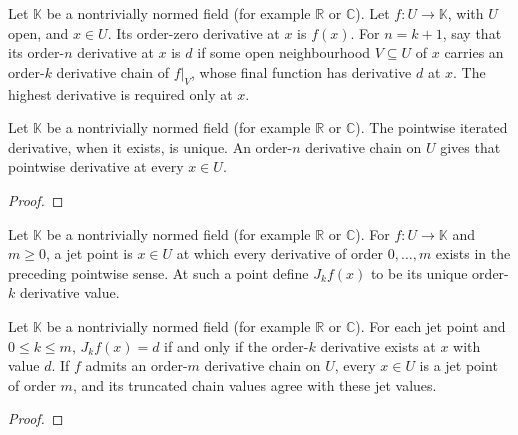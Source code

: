 \begin{supporting}
\begin{definition}
\label{def:open-domain-pointwise-derivative}
\leanok
Let $\mathbb K$ be a nontrivially normed field (for example $\mathbb R$ or $\mathbb C$).
Let $f:U\to\mathbb K$, with $U$ open, and $x\in U$. Its order-zero derivative
at $x$ is $f(x)$. For $n=k+1$, say that its order-$n$ derivative at $x$ is $d$
if some open neighbourhood $V\subseteq U$ of $x$ carries an order-$k$
derivative chain of $f|_V$, whose final function has derivative $d$ at $x$.
The highest derivative is required only at $x$.
\end{definition}

\begin{theorem}
\label{thm:open-domain-pointwise-derivative}
\leanok
Let $\mathbb K$ be a nontrivially normed field (for example $\mathbb R$ or $\mathbb C$).
The pointwise iterated derivative, when it exists, is unique. An order-$n$
derivative chain on $U$ gives that pointwise derivative at every $x\in U$.
\end{theorem}
\begin{proof}
\leanok
\end{proof}

\begin{definition}
\label{def:open-domain-derivative-jet}
\leanok
Let $\mathbb K$ be a nontrivially normed field (for example $\mathbb R$ or $\mathbb C$).
For $f:U\to\mathbb K$ and $m\ge0$, a jet point is $x\in U$ at which every
derivative of order $0,\ldots,m$ exists in the preceding pointwise sense.
At such a point define $J_kf(x)$ to be its unique order-$k$ derivative value.
\end{definition}

\begin{theorem}
\label{thm:open-domain-derivative-jet}
\leanok
Let $\mathbb K$ be a nontrivially normed field (for example $\mathbb R$ or $\mathbb C$).
For each jet point and $0\le k\le m$, $J_kf(x)=d$ if and only if the
order-$k$ derivative exists at $x$ with value $d$. If $f$ admits an order-$m$ derivative chain on $U$, every $x\in U$ is a jet point of order $m$, and its truncated chain values agree
with these jet values.
\end{theorem}
\begin{proof}
\leanok
\end{proof}

\end{supporting}

